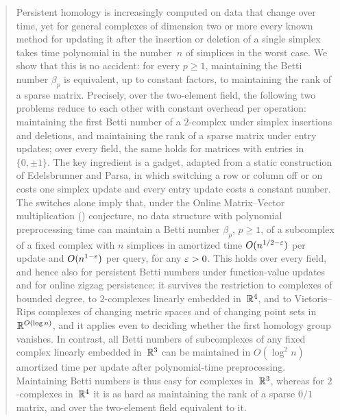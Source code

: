 \begin{abstract}
Persistent homology is increasingly computed on data that change over time, yet for general complexes of dimension two or more every known method for updating it after the insertion or deletion of a single simplex takes time polynomial in the number~$n$ of simplices in the worst case.
We show that this is no accident: for every $p\ge1$, maintaining the Betti number $\beta_p$ is equivalent, up to constant factors, to maintaining the rank of a sparse matrix.
Precisely, over the two-element field, the following two problems reduce to each other with constant overhead per operation: maintaining the first Betti number of a $2$-complex under simplex insertions and deletions, and maintaining the rank of a sparse matrix under entry updates; over every field, the same holds for matrices with entries in $\{0,\pm1\}$.
The key ingredient is a gadget, adapted from a static construction of Edelsbrunner and Parsa, in which switching a row or column off or on costs one simplex update and every entry update costs a constant number.
The switches alone imply that, under the Online Matrix--Vector multiplication (\OMv) conjecture, no data structure with polynomial preprocessing time can maintain a Betti number $\beta_p$, $p\ge1$, of a subcomplex of a fixed complex with $n$ simplices in amortized time $O(n^{1/2-\eps})$ per update and $O(n^{1-\eps})$ per query, for any $\eps>0$.
This holds over every field, and hence also for persistent Betti numbers under function-value updates and for online zigzag persistence; it survives the restriction to complexes of bounded degree, to $2$-complexes linearly embedded in~$\R^4$, and to Vietoris--Rips complexes of changing metric spaces and of changing point sets in~$\R^{O(\log n)}$, and it applies even to deciding whether the first homology group vanishes.
In contrast, all Betti numbers of subcomplexes of any fixed complex linearly embedded in~$\R^3$ can be maintained in $O(\log^2 n)$ amortized time per update after polynomial-time preprocessing.
Maintaining Betti numbers is thus easy for complexes in~$\R^3$, whereas for $2$-complexes in~$\R^4$ it is as hard as maintaining the rank of a sparse $0/1$ matrix, and over the two-element field equivalent to it.
\end{abstract}
